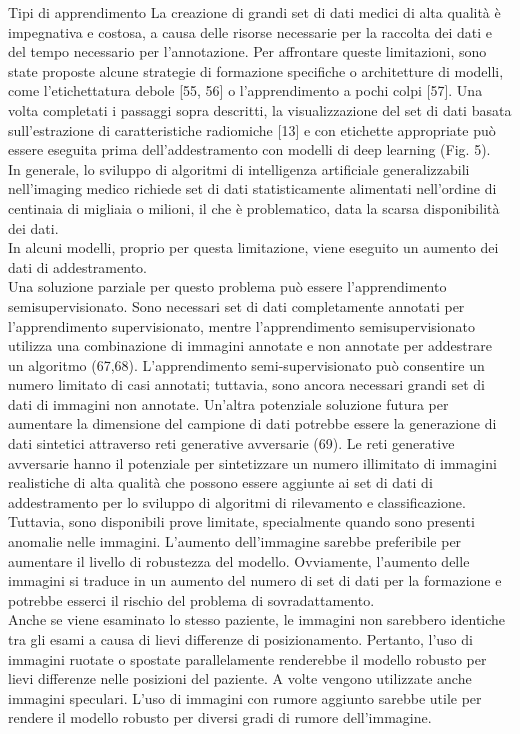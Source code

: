 \documentclass[12pt,a4paper]{report}
\begin{document}
\begin{subsection}{Tipi di apprendimento}
La creazione di grandi set di dati medici di alta qualità è impegnativa e costosa, a causa delle risorse necessarie per la raccolta dei dati e del tempo necessario per l'annotazione. Per affrontare queste limitazioni, sono state proposte alcune strategie di formazione specifiche o architetture di modelli, come l'etichettatura debole [55, 56] o l'apprendimento a pochi colpi [57].
Una volta completati i passaggi sopra descritti, la visualizzazione del set di dati basata sull'estrazione di caratteristiche radiomiche [13] e con etichette appropriate può essere eseguita prima dell'addestramento con modelli di deep learning (Fig. 5).
\\
In generale, lo sviluppo di algoritmi di intelligenza artificiale generalizzabili nell'imaging medico richiede set di dati statisticamente alimentati nell'ordine di centinaia di migliaia o milioni, il che è problematico, data la scarsa disponibilità
dei dati.\\
In alcuni modelli, proprio per questa limitazione, viene eseguito un aumento dei dati di addestramento.\\
Una soluzione parziale per questo problema può essere l'apprendimento semisupervisionato. Sono necessari
set di dati completamente annotati per l'apprendimento supervisionato, mentre l'apprendimento semisupervisionato
utilizza una combinazione di immagini annotate e non annotate per addestrare un algoritmo (67,68).
L'apprendimento semi-supervisionato può consentire un numero limitato di casi annotati; tuttavia, sono ancora 
necessari grandi set di dati di immagini non annotate.
Un'altra potenziale soluzione futura per aumentare la dimensione del campione di dati potrebbe essere la generazione di dati 
sintetici attraverso reti generative avversarie (69). Le reti generative avversarie hanno il potenziale per sintetizzare un numero
illimitato di immagini realistiche di alta qualità che possono essere aggiunte ai set di dati di addestramento per lo sviluppo di 
algoritmi di rilevamento e classificazione. Tuttavia, sono disponibili prove limitate, specialmente quando sono presenti anomalie nelle immagini.
L'aumento dell'immagine sarebbe preferibile per aumentare il livello di robustezza del modello. Ovviamente, l'aumento delle immagini si traduce in un aumento del numero di set di dati per la formazione e potrebbe esserci il rischio del problema di sovradattamento.\\
Anche se viene esaminato lo stesso paziente, le immagini non sarebbero identiche tra gli esami a causa di lievi differenze di posizionamento. 
Pertanto, l'uso di immagini ruotate o spostate parallelamente renderebbe il modello robusto per lievi differenze nelle posizioni del paziente. A volte vengono utilizzate anche immagini speculari. L'uso di immagini con rumore aggiunto sarebbe utile per rendere il modello robusto per diversi gradi di rumore dell'immagine.\\
\end{subsection}
\end{document}
